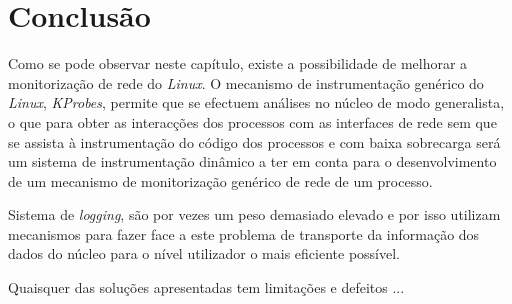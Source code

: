 
\section{Conclusão}

Como se pode observar neste capítulo, existe a possibilidade de melhorar a monitorização de rede do \textit{Linux}.
O mecanismo de instrumentação genérico do \textit{Linux}, \textit{KProbes}, permite que se efectuem análises no núcleo de modo generalista, o que para obter as interacções dos processos com as interfaces de rede sem que se assista à instrumentação do código dos processos e com baixa sobrecarga será um sistema de instrumentação dinâmico a ter em conta para o desenvolvimento de um mecanismo de monitorização genérico de rede de um processo.

Sistema de \textit{logging}, são por vezes um peso demasiado elevado e por isso utilizam mecanismos para fazer face a este problema de transporte da informação dos dados do núcleo para o nível utilizador o mais eficiente possível.


Quaisquer das soluções apresentadas tem limitações e defeitos ...

